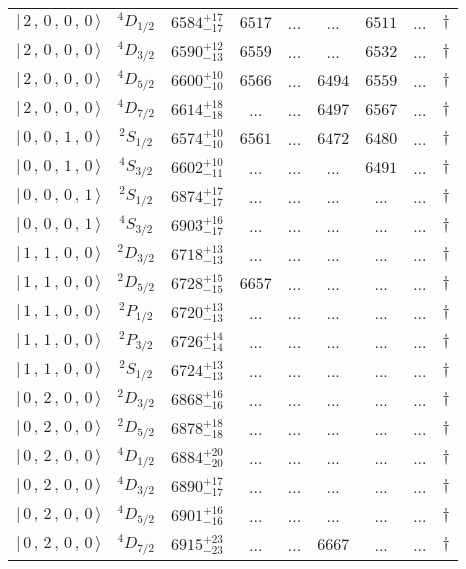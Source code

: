 \begin{tabular}{c c| c c c c c c c}
$\vert \,2\,,\,0\,,\,0\,,\,0 \,\rangle $ & $^{4}D_{1/2}$ & $6584^{+17}_{-17}$ & $6517$ & ... & ... & $6511$ & ... & $\dagger$ \\ 
$\vert \,2\,,\,0\,,\,0\,,\,0 \,\rangle $ & $^{4}D_{3/2}$ & $6590^{+12}_{-13}$ & $6559$ & ... & ... & $6532$ & ... & $\dagger$ \\ 
$\vert \,2\,,\,0\,,\,0\,,\,0 \,\rangle $ & $^{4}D_{5/2}$ & $6600^{+10}_{-10}$ & $6566$ & ... & $6494$ & $6559$ & ... & $\dagger$ \\ 
$\vert \,2\,,\,0\,,\,0\,,\,0 \,\rangle $ & $^{4}D_{7/2}$ & $6614^{+18}_{-18}$ & ... & ... & $6497$ & $6567$ & ... & $\dagger$ \\ 
$\vert \,0\,,\,0\,,\,1\,,\,0 \,\rangle $ & $^{2}S_{1/2}$ & $6574^{+10}_{-10}$ & $6561$ & ... & $6472$ & $6480$ & ... & $\dagger$ \\ 
$\vert \,0\,,\,0\,,\,1\,,\,0 \,\rangle $ & $^{4}S_{3/2}$ & $6602^{+10}_{-11}$ & ... & ... & ... & $6491$ & ... & $\dagger$ \\ 
$\vert \,0\,,\,0\,,\,0\,,\,1 \,\rangle $ & $^{2}S_{1/2}$ & $6874^{+17}_{-17}$ & ... & ... & ... & ... & ... & $\dagger$ \\ 
$\vert \,0\,,\,0\,,\,0\,,\,1 \,\rangle $ & $^{4}S_{3/2}$ & $6903^{+16}_{-17}$ & ... & ... & ... & ... & ... & $\dagger$ \\ 
$\vert \,1\,,\,1\,,\,0\,,\,0 \,\rangle $ & $^{2}D_{3/2}$ & $6718^{+13}_{-13}$ & ... & ... & ... & ... & ... & $\dagger$ \\ 
$\vert \,1\,,\,1\,,\,0\,,\,0 \,\rangle $ & $^{2}D_{5/2}$ & $6728^{+15}_{-15}$ & $6657$ & ... & ... & ... & ... & $\dagger$ \\ 
$\vert \,1\,,\,1\,,\,0\,,\,0 \,\rangle $ & $^{2}P_{1/2}$ & $6720^{+13}_{-13}$ & ... & ... & ... & ... & ... & $\dagger$ \\ 
$\vert \,1\,,\,1\,,\,0\,,\,0 \,\rangle $ & $^{2}P_{3/2}$ & $6726^{+14}_{-14}$ & ... & ... & ... & ... & ... & $\dagger$ \\ 
$\vert \,1\,,\,1\,,\,0\,,\,0 \,\rangle $ & $^{2}S_{1/2}$ & $6724^{+13}_{-13}$ & ... & ... & ... & ... & ... & $\dagger$ \\ 
$\vert \,0\,,\,2\,,\,0\,,\,0 \,\rangle $ & $^{2}D_{3/2}$ & $6868^{+16}_{-16}$ & ... & ... & ... & ... & ... & $\dagger$ \\ 
$\vert \,0\,,\,2\,,\,0\,,\,0 \,\rangle $ & $^{2}D_{5/2}$ & $6878^{+18}_{-18}$ & ... & ... & ... & ... & ... & $\dagger$ \\ 
$\vert \,0\,,\,2\,,\,0\,,\,0 \,\rangle $ & $^{4}D_{1/2}$ & $6884^{+20}_{-20}$ & ... & ... & ... & ... & ... & $\dagger$ \\ 
$\vert \,0\,,\,2\,,\,0\,,\,0 \,\rangle $ & $^{4}D_{3/2}$ & $6890^{+17}_{-17}$ & ... & ... & ... & ... & ... & $\dagger$ \\ 
$\vert \,0\,,\,2\,,\,0\,,\,0 \,\rangle $ & $^{4}D_{5/2}$ & $6901^{+16}_{-16}$ & ... & ... & ... & ... & ... & $\dagger$ \\ 
$\vert \,0\,,\,2\,,\,0\,,\,0 \,\rangle $ & $^{4}D_{7/2}$ & $6915^{+23}_{-23}$ & ... & ... & $6667$ & ... & ... & $\dagger$ \\ 
\hline \hline
\end{tabular}
